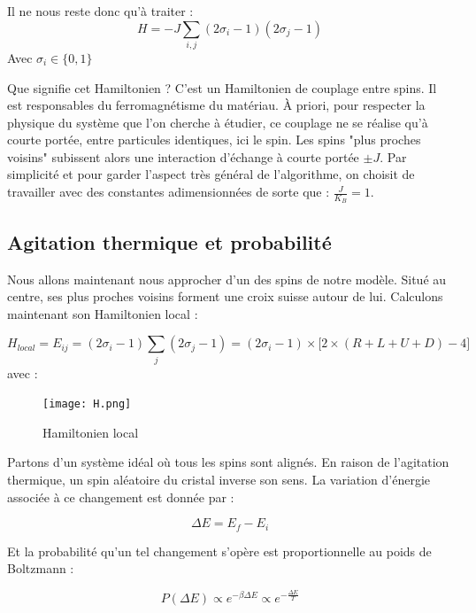 \documentclass[11pt, parskip=half]{scrartcl} %
\begin{document}
Il ne nous reste donc qu'à traiter :
\begin{equation*}
	H = -J  \displaystyle \sum_{i,j}(2\sigma_{i}-1)(2\sigma_{j}-1)
\end{equation*}
Avec $\sigma_{i} \in \{0,1\}$

Que signifie cet Hamiltonien ? C'est un Hamiltonien de couplage entre spins. Il est responsables du ferromagnétisme du matériau. À priori, pour respecter la physique du système que l'on cherche à étudier, ce couplage ne se réalise qu'à courte portée, entre particules identiques, ici le spin. Les spins "plus proches voisins" subissent alors une interaction d'échange à courte portée $\pm J$. Par simplicité et pour garder l'aspect très général de l'algorithme, on choisit de travailler avec des constantes adimensionnées de sorte que : $\frac{J}{K_B} = 1$.

\subsection{Agitation thermique et probabilité}
Nous allons maintenant nous approcher d'un des spins de notre modèle. Situé au centre, ses plus proches voisins forment une croix suisse autour de lui. Calculons maintenant son Hamiltonien local : 

\begin{equation*}
	H_{local} = E_{ij} =  (2\sigma_{i}-1) \displaystyle \sum_{j}(2\sigma_{j}-1) = (2\sigma_{i}-1) \times \bigg[ 2\times( R + L + U + D ) -4 \bigg]
\end{equation*}
avec :

\begin{figure}[h]
	\centering
	\texttt{[image: H.png]}
	\caption{Hamiltonien local}
	\label{fig:H}
\end{figure}

Partons d'un système idéal où tous les spins sont alignés. En raison de l'agitation thermique, un spin aléatoire du cristal inverse son sens. La variation d'énergie associée à ce changement est donnée par :

\begin{equation*}
\Delta E = E_f - E_i
\end{equation*}

Et la probabilité qu'un tel changement s'opère est proportionnelle au poids de Boltzmann :

\begin{equation*}
P(\Delta E) \propto e^{-\beta \Delta E} \propto e^{-\frac{\Delta E}{T}}
\end{equation*}
\end{document}
